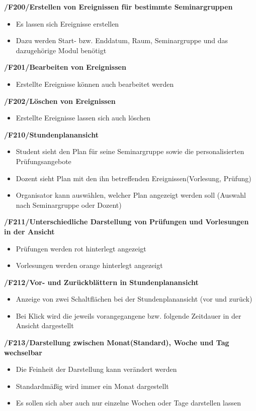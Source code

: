 \documentclass[12pt, a4paper]{scrartcl}
\newcommand{\ford}[2]{\textbf{/#1/\hspace{2em}#2}}
\begin{document}
\ford{F200}{Erstellen von Ereignissen für bestimmte Seminargruppen}
\begin{itemize}
	\item Es lassen sich Ereignisse erstellen
	\item Dazu werden Start- bzw. Enddatum, Raum, Seminargruppe und das dazugehörige Modul benötigt
\end{itemize}

\ford{F201}{Bearbeiten von Ereignissen}
\begin{itemize}
	\item Erstellte Ereignisse können auch bearbeitet werden
\end{itemize}

\ford{F202}{Löschen von Ereignissen}
\begin{itemize}
	\item Erstellte Ereignisse lassen sich auch löschen
\end{itemize}

\ford{F210}{Stundenplanansicht}
\begin{itemize}
	\item Student sieht den Plan für seine Seminargruppe sowie die personalisierten Prüfungsangebote
	\item Dozent sieht Plan mit den ihn betreffenden Ereignissen(Vorlesung, Prüfung)
	\item Organisator kann auswählen, welcher Plan angezeigt werden soll (Auswahl nach Seminargruppe oder Dozent)
\end{itemize}

\ford{F211}{Unterschiedliche Darstellung von Prüfungen und Vorlesungen in der Ansicht}
\begin{itemize}
	\item Prüfungen werden rot hinterlegt angezeigt
	\item Vorlesungen werden orange hinterlegt angezeigt
\end{itemize}

\ford{F212}{Vor- und Zurückblättern in Stundenplanansicht}
\begin{itemize}
	\item Anzeige von zwei Schaltflächen bei der Stundenplanansicht (vor und zurück)
	\item Bei Klick wird die jeweils vorangegangene bzw. folgende Zeitdauer in der Ansicht dargestellt
\end{itemize}

\newpage
\ford{F213}{Darstellung zwischen Monat(Standard), Woche und Tag wechselbar}
\begin{itemize}
	\item Die Feinheit der Darstellung kann verändert werden
	\item Standardmäßig wird immer ein Monat dargestellt
	\item Es sollen sich aber auch nur einzelne Wochen oder Tage darstellen lassen
\end{itemize}
\end{document}
